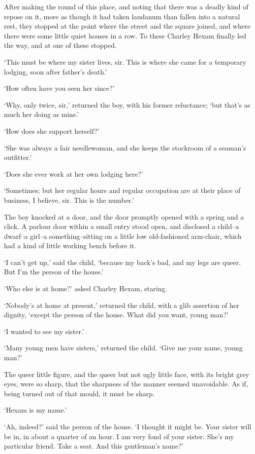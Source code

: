 After making the round of this place, and noting that there was a deadly
kind of repose on it, more as though it had taken laudanum than fallen
into a natural rest, they stopped at the point where the street and the
square joined, and where there were some little quiet houses in a row.
To these Charley Hexam finally led the way, and at one of these stopped.

‘This must be where my sister lives, sir. This is where she came for a
temporary lodging, soon after father’s death.’

‘How often have you seen her since?’

‘Why, only twice, sir,’ returned the boy, with his former reluctance;
‘but that’s as much her doing as mine.’

‘How does she support herself?’

‘She was always a fair needlewoman, and she keeps the stockroom of a
seaman’s outfitter.’

‘Does she ever work at her own lodging here?’

‘Sometimes; but her regular hours and regular occupation are at their
place of business, I believe, sir. This is the number.’

The boy knocked at a door, and the door promptly opened with a spring
and a click. A parlour door within a small entry stood open, and
disclosed a child--a dwarf--a girl--a something--sitting on a little low
old-fashioned arm-chair, which had a kind of little working bench before
it.

‘I can’t get up,’ said the child, ‘because my back’s bad, and my legs
are queer. But I’m the person of the house.’

‘Who else is at home?’ asked Charley Hexam, staring.

‘Nobody’s at home at present,’ returned the child, with a glib assertion
of her dignity, ‘except the person of the house. What did you want,
young man?’

‘I wanted to see my sister.’

‘Many young men have sisters,’ returned the child. ‘Give me your name,
young man?’

The queer little figure, and the queer but not ugly little face, with
its bright grey eyes, were so sharp, that the sharpness of the manner
seemed unavoidable. As if, being turned out of that mould, it must be
sharp.

‘Hexam is my name.’

‘Ah, indeed?’ said the person of the house. ‘I thought it might be. Your
sister will be in, in about a quarter of an hour. I am very fond of your
sister. She’s my particular friend. Take a seat. And this gentleman’s
name?’

